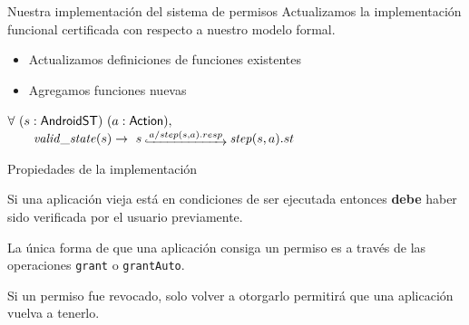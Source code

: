 \documentclass[pdf]{beamer} %
\begin{document}
\begin{frame}{Nuestra implementación del sistema de permisos}
    Actualizamos la implementación funcional certificada con respecto a nuestro modelo formal.
    \begin{itemize}
        \item Actualizamos definiciones de funciones existentes
        \item Agregamos funciones nuevas
    \end{itemize}
    \pause \vspace{20px}
    \begin{theorem}
        $ \forall\ (s:\AndroidState)\ (a:\Action),$ \\
        $\quad \quad \ap{valid\_state}{s} \rightarrow\ s\step{a/step(s,a).resp} \bap{step}{s}{a}.st$
    \end{theorem}
\end{frame}

\begin{frame}{Propiedades de la implementación}
    \begin{prop}
        Si una aplicación vieja está en condiciones de ser ejecutada entonces \textbf{debe} haber
        sido verificada por el usuario previamente.
    \end{prop}

    \begin{prop}
        La única forma de que una aplicación consiga un permiso es a través de las operaciones
        \texttt{grant} o \texttt{grantAuto}.
    \end{prop}

    \begin{prop}
        Si un permiso fue revocado, solo volver a otorgarlo permitirá que una aplicación vuelva a
        tenerlo.
    \end{prop}
\end{frame}
\end{document}
